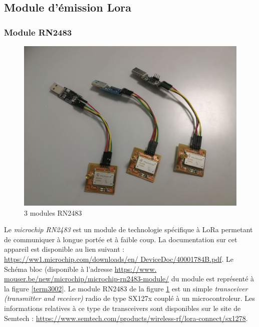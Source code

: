 \subsection{Module d'émission Lora}

\subsubsection{Module RN2483}

\begin{figure}[h]
\centering

\includegraphics[scale=0.08]{images/rn2483.png}
\caption{3 modules RN2483}\label{term34}
\end{figure}


Le \textit{microchip RN2483} est un module de technologie spécifique à LoRa permetant de communiquer à longue portée et à faible coup. La documentation sur cet appareil est disponible au lien suivant : \href{https://ww1.microchip.com/downloads/en/DeviceDoc/40001784B.pdf}{https://ww1.microchip.com/downloads/en/
DeviceDoc/40001784B.pdf}. Le Schéma bloc (disponible à l'adresse \href{https://www.mouser.be/new/microchip/microchip-rn2483-module/}{https://www.
mouser.be/new/microchip/microchip-rn2483-module/} du module est représenté à la figure \ref{term3002}. Le module RN2483 de la figure \ref{term34} est un simple \textit{transceiver (transmitter and receiver)} radio de type SX127x couplé à un microcontroleur. Les informations relatives à ce type de transceivers sont disponibles sur le site de Semtech : \href{https://www.semtech.com/products/wireless-rf/lora-connect/sx1278}{https://www.semtech.com/products/wireless-rf/lora-connect/sx1278}.


